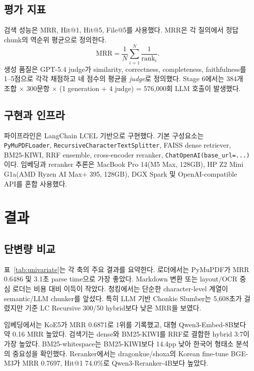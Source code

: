 \documentclass[10pt,a4paper,twocolumn]{article}
\newcommand{\code}[1]{\texttt{#1}}
\begin{document}
\subsection{평가 지표}
검색 성능은 MRR, Hit@1, Hit@5, File@5를 사용했다. MRR은 각 질의에서 정답 chunk의 역순위 평균으로 정의한다.
\begin{equation}
\mathrm{MRR}=\frac{1}{N}\sum_{i=1}^{N}\frac{1}{\mathrm{rank}_i}.
\end{equation}
생성 품질은 GPT-5.4 judge가 similarity, correctness, completeness, faithfulness를 1--5점으로 각각 채점하고 네 점수의 평균을 \emph{judge}로 정의했다. Stage 6에서는 384개 조합 $\times$ 300문항 $\times$ (1 generation + 4 judge) = 576,000회 LLM 호출이 발생했다.

\subsection{구현과 인프라}
파이프라인은 LangChain LCEL 기반으로 구현했다. 기본 구성요소는 \code{PyMuPDFLoader}, \code{RecursiveCharacterTextSplitter}, FAISS dense retriever, BM25-KIWI, RRF ensemble, cross-encoder reranker, \code{ChatOpenAI(base\_url=...)}이다. 임베딩과 reranker 추론은 MacBook Pro 14(M5 Max, 128GB), HP Z2 Mini G1a(AMD Ryzen AI Max+ 395, 128GB), DGX Spark 및 OpenAI-compatible API를 혼합 사용했다.

\section{결과}
\subsection{단변량 비교}
표~\ref{tab:univariate}는 각 축의 주요 결과를 요약한다. 로더에서는 PyMuPDF가 MRR 0.6486 및 3.1초 parse time으로 가장 좋았다. Markdown 변환 또는 layout/OCR 중심 로더는 비용 대비 이득이 작았다. 청킹에서는 단순한 character-level 계열이 semantic/LLM chunker를 앞섰다. 특히 LLM 기반 Chonkie Slumber는 5,608초가 걸렸지만 기준 LC Recursive 300/50 hybrid보다 낮은 MRR을 보였다.

임베딩에서는 KoE5가 MRR 0.6871로 1위를 기록했고, 대형 Qwen3-Embed-8B보다 약 0.16 MRR 높았다. 검색기는 dense와 BM25-KIWI를 RRF로 결합한 hybrid 3:7이 가장 높았다. BM25-whitespace는 BM25-KIWI보다 14.4pp 낮아 한국어 형태소 분석의 중요성을 확인했다. Reranker에서는 dragonkue/shoxa의 Korean fine-tune BGE-M3가 MRR 0.7697, Hit@1 74.0\%로 Qwen3-Reranker-4B보다 높았다.
\end{document}
